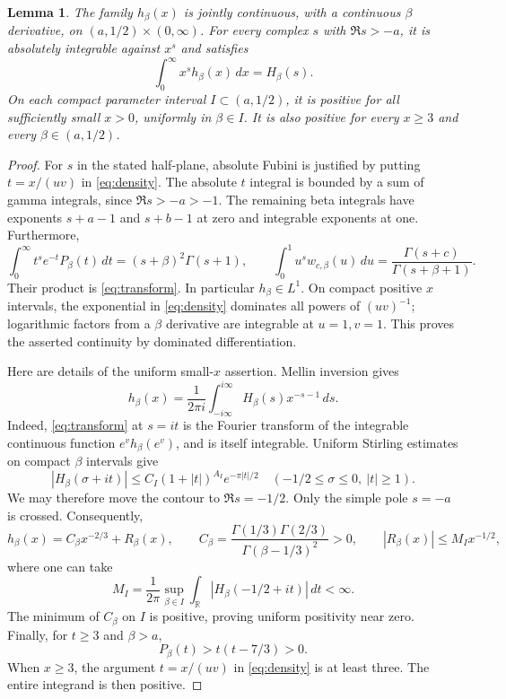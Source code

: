 \documentclass[11pt]{article}
\newtheorem{lemma}[theorem]{Lemma}
\newcommand{\R}{\mathbb R}
\begin{document}
\begin{lemma}\label{lem:properties}
The family $h_\beta(x)$ is jointly continuous, with a continuous
$\beta$ derivative, on $(a,1/2)\times(0,\infty)$.
For every complex $s$ with $\Re s>-a$, it is absolutely integrable
against $x^s$ and satisfies
\begin{equation}\label{eq:transform}
 \int_0^\infty x^s h_\beta(x)\,dx=H_\beta(s).
\end{equation}
On each compact parameter interval $I\subset(a,1/2)$, it is positive
for all sufficiently small $x>0$, uniformly in $\beta\in I$.
It is also positive for every $x\geq3$ and every $\beta\in(a,1/2)$.
\end{lemma}
\begin{proof}
For $s$ in the stated half-plane, absolute Fubini is justified by
putting $t=x/(uv)$ in \eqref{eq:density}. The absolute $t$ integral is
bounded by a sum of gamma integrals, since $\Re s>-a>-1$.
The remaining beta integrals have exponents $s+a-1$ and $s+b-1$
at zero and integrable exponents at one. Furthermore,
\[
 \int_0^\infty t^s e^{-t}P_\beta(t)\,dt
 =(s+\beta)^2\Gamma(s+1),\qquad
 \int_0^1 u^s w_{c,\beta}(u)\,du
 =\frac{\Gamma(s+c)}{\Gamma(s+\beta+1)}.
\]
Their product is \eqref{eq:transform}. In particular $h_\beta\in L^1$.
On compact positive $x$ intervals, the exponential in
\eqref{eq:density} dominates all powers of $(uv)^{-1}$; logarithmic
factors from a $\beta$ derivative are integrable at $u=1,v=1$.
This proves the asserted continuity by dominated differentiation.

Here are details of the uniform small-$x$ assertion. Mellin inversion gives
\[
 h_\beta(x)=\frac1{2\pi i}\int_{-i\infty}^{i\infty}
                   H_\beta(s)x^{-s-1}\,ds.
\]
Indeed, \eqref{eq:transform} at $s=it$ is the Fourier transform of the
integrable continuous function $e^v h_\beta(e^v)$, and is itself integrable.
Uniform Stirling estimates on compact $\beta$ intervals give
\[
 |H_\beta(\sigma+it)|\leq C_I(1+|t|)^{A_I}e^{-\pi|t|/2}
 \quad(-1/2\leq\sigma\leq0,\ |t|\geq1).
\]
We may therefore move the contour to $\Re s=-1/2$. Only the simple pole
$s=-a$ is crossed. Consequently,
\begin{equation}\label{eq:small}
 h_\beta(x)=C_\beta x^{-2/3}+R_\beta(x),\qquad
 C_\beta=\frac{\Gamma(1/3)\Gamma(2/3)}{\Gamma(\beta-1/3)^2}>0,
 \qquad |R_\beta(x)|\leq M_I x^{-1/2},
\end{equation}
where one can take
\[
 M_I=\frac1{2\pi}\sup_{\beta\in I}
          \int_{\R}|H_\beta(-1/2+it)|\,dt<\infty.
\]
The minimum of $C_\beta$ on $I$ is positive, proving uniform positivity
near zero. Finally, for $t\geq3$ and $\beta>a$,
\[
 P_\beta(t)>t(t-7/3)>0.
\]
When $x\geq3$, the argument $t=x/(uv)$ in \eqref{eq:density} is at
least three. The entire integrand is then positive.
\end{proof}
\end{document}

